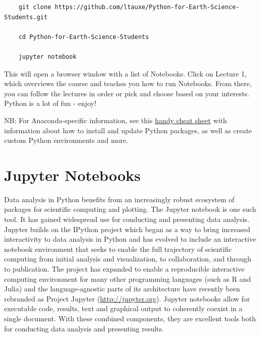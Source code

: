 \documentclass[11pt]{book}
\begin{document}
{{\begin{enumerate}
\begin{verbatim}
    git clone https://github.com/ltauxe/Python-for-Earth-Science-Students.git

    cd Python-for-Earth-Science-Students

    jupyter notebook
\end{verbatim}

\end{enumerate}
This will open a browser window with a list of Notebooks.  Click on Lecture 1, which overviews the course and teaches you how to run Notebooks.  From there, you can follow the lectures in order or pick and choose based on your interests. Python is a lot of fun - enjoy!

NB: For Anaconda-specific information, see this \href{https://docs.anaconda.com/_downloads/Anaconda-Starter-Guide-Cheat-Sheet.pdf}{handy cheat sheet} with information about how to install and update Python packages, as well as create custom Python environments and more.

\chapter{Jupyter Notebooks}
\label{chap:notebooks}

Data analysis in Python benefits from an increasingly robust ecosystem of packages for scientific computing and plotting. The Jupyter notebook is one such tool.  It has gained widespread use for conducting and presenting data analysis. Jupyter builds on the IPython project which began as a way to bring increased interactivity to data analysis in Python \citep{perez07} and has evolved to include an interactive notebook environment that seeks to enable the full trajectory of scientific computing from initial analysis and visualization, to collaboration, and through to publication. The project has expanded to enable a reproducible interactive computing environment for many other programming languages (such as R and Julia) and the language-agnostic parts of its architecture have recently been rebranded as Project Jupyter (\url{http://jupyter.org}). Jupyter notebooks allow for executable code, results, text and graphical output to coherently coexist in a single document. With these combined components, they are excellent tools both for conducting data analysis and presenting results.



}}
\end{document}
